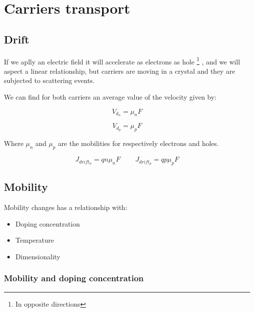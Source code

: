 
	\section{Carriers transport} %
		
		\label{cha:carriers_transport}

		\subsection{Drift} %

			\label{sub:drift}
			If we aplly an electric field it will accelerate as electrons as hole \footnote{In opposite directions} , and we will aspect a linear relationship, but carriers are moving in a crystal and they are subjected to scattering events.

			We can find for both carriers an average value of the velocity given by:

			\begin{equation}
				V_{d_n}= \mu_n F
			\end{equation}

			\begin{equation}
				V_{d_p}= \mu_p F
			\end{equation}

			Where $ \mu_n$ and $\mu_p$ are the mobilities for respectively electrons and holes.

			\begin{equation}
				J_{drift_n}=qn \mu_n F \ \ \ \ \ \ \ \ \ \ J_{drift_p}=qp \mu_p F 
			\end{equation}

		\subsection{Mobility} %
			\label{sub:mobility}
			Mobility changes has a relationship with:
			
			\begin{itemize}
			 	\item Doping concentration
			 	\item Temperature
			 	\item Dimensionality
			 \end{itemize} 
			
			 \subsubsection{Mobility and doping concentration}
			
